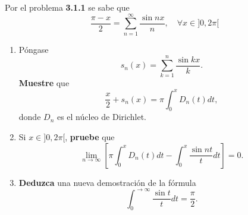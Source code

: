 \documentclass[12pt]{report}
\newcounter{it}
\theoremstyle{largebreak}
\begin{document}
    \begin{excer}
        Por el problema \textbf{3.1.1} se sabe que
        \begin{equation*}
            \frac{\pi-x}{2}=\sum_{ n=1}^\infty\frac{\sin nx}{n},\quad\forall x\in]0,2\pi[
        \end{equation*}
        \begin{enumerate}
            \item Póngase
            \begin{equation*}
                s_n(x)=\sum_{k=1}^n \frac{\sin kx}{k}.
            \end{equation*}
            \textbf{Muestre} que
            \begin{equation*}
                \frac{x}{2}+s_n(x)=\pi\int_0^x D_n(t)dt,
            \end{equation*}
            donde $D_n$ es el núcleo de Dirichlet.
            \item Si $x\in]0,2\pi[$, \textbf{pruebe} que
            \begin{equation*}
                \lim_{ n\rightarrow\infty}\left[\pi\int_0^x D_n(t)dt- \int_0^x\frac{\sin nt}{t}dt \right]=0.
            \end{equation*}
            \item \textbf{Deduzca} una nueva demostración de la fórmula
            \begin{equation*}
                \int_0^{\rightarrow\infty}\frac{\sin t}{t}dt=\frac{\pi}{2}.
            \end{equation*}
        \end{enumerate}
    \end{excer}
\end{document}
